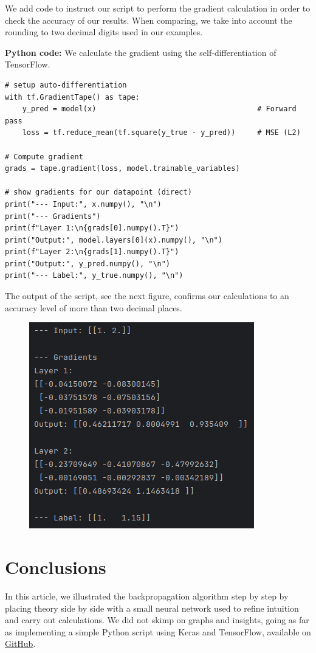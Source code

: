 \documentclass{article}
\begin{document}
We add code to instruct our script to perform the gradient calculation in order to check the accuracy of our results. When comparing, we take into account the rounding to two decimal digits used in our examples.


\textbf{Python code:} We calculate the gradient using the self-differentiation of TensorFlow.

\begin{tcolorbox}[colback=gray!10, colframe=gray!50, title=Gradient calculation]
\begin{verbatim}
# setup auto-differentiation
with tf.GradientTape() as tape:
    y_pred = model(x)                                     # Forward pass
    loss = tf.reduce_mean(tf.square(y_true - y_pred))     # MSE (L2)

# Compute gradient
grads = tape.gradient(loss, model.trainable_variables)

# show gradients for our datapoint (direct)
print("--- Input:", x.numpy(), "\n")
print("--- Gradients")
print(f"Layer 1:\n{grads[0].numpy().T}")
print("Output:", model.layers[0](x).numpy(), "\n")
print(f"Layer 2:\n{grads[1].numpy().T}")
print("Output:", y_pred.numpy(), "\n")
print("--- Label:", y_true.numpy(), "\n")
\end{verbatim}
\end{tcolorbox}

 The output of the script, see the next figure, confirms our calculations to an accuracy level of more than two decimal places.

\begin{figure}[H]
    \centering
    \includegraphics[width=0.5\linewidth]{images/output.png}

\end{figure}

\section{Conclusions}

In this article, we illustrated the backpropagation algorithm step by step by placing theory side by side with a small neural network used to refine intuition and carry out calculations. We did not skimp on graphs and insights, going as far as implementing a simple Python script using Keras and TensorFlow, available on \href{github.com/nicolinux72/backpropagation.git}{GitHub}.

\nocite{*}
\printbibliography
\end{document}

